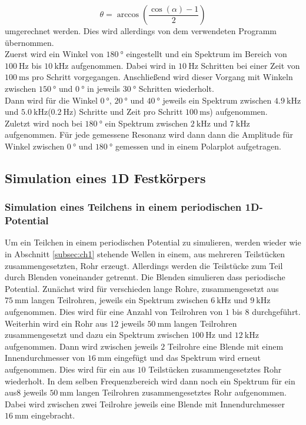 \begin{equation}
  \label{eqn:de1ch2}
  \theta = \arccos\left( \frac{\cos(\alpha) - 1}{2} \right)
\end{equation}
umgerechnet werden. Dies wird allerdings von dem verwendeten Programm übernommen.\\
Zuerst wird ein Winkel von $\SI{180}{\degree}$
eingestellt und ein Spektrum im Bereich von
$\SI{100}{\hertz}$ bis $\SI{10}{\kilo\hertz}$
aufgenommen. Dabei wird in $\SI{10}{\hertz}$ Schritten
bei einer Zeit von $\SI{100}{\milli\second}$ pro Schritt
vorgegangen. Anschließend wird dieser Vorgang mit
Winkeln zwischen $\SI{150}{\degree}$ und $\SI{0}{\degree}$
in jeweils $\SI{30}{\degree}$ Schritten wiederholt.\\
Dann wird für die Winkel $\SI{0}{\degree}$,
$\SI{20}{\degree}$ und $\SI{40}{\degree}$ jeweils
ein Spektrum zwischen $\SI{4,9}{\kilo\hertz}$ und
$\SI{5,0}{\kilo\hertz}$($\SI{0,2}{\hertz}$) Schritte
und Zeit pro Schritt $\SI{100}{\milli\second}$)
aufgenommen.\\
Zuletzt wird noch bei $\SI{180}{\degree}$ ein Spektrum
zwischen $\SI{2}{\kilo\hertz}$ und $\SI{7}{\kilo\hertz}$
aufgenommen. Für jede gemessene Resonanz wird dann
dann die Amplitude für Winkel zwischen $\SI{0}{\degree}$
und $\SI{180}{\degree}$ gemessen und in einem Polarplot
aufgetragen.

\subsection{Simulation eines 1D Festkörpers}
\label{subsec:ch4}

\subsubsection{Simulation eines Teilchens in einem
periodischen 1D-Potential}
\label{subsubsec:ch4a}
Um ein Teilchen in einem periodischen Potential
zu simulieren, werden wieder wie in Abschnitt
\ref{subsec:ch1} stehende Wellen in einem, aus
mehreren Teilstücken zusammengesetzten, Rohr
erzeugt. Allerdings werden die Teilstücke zum Teil durch
Blenden voneinander getrennt. Die Blenden simulieren
dass periodische Potential.
Zunächst wird für verschieden lange Rohre, zusammengesetzt
aus $\SI{75}{\milli\meter}$ langen Teilrohren, jeweils
ein Spektrum zwischen $\SI{6}{\kilo\hertz}$ und
$\SI{9}{\kilo\hertz}$ aufgenommen. Dies wird für eine Anzahl
von Teilrohren von $1$ bis $8$ durchgeführt.\\
Weiterhin wird ein Rohr aus $12$ jeweils
$\SI{50}{\milli\meter}$ langen Teilrohren zusammengesetzt
und dazu ein Spektrum zwischen $\SI{100}{\hertz}$
und $\SI{12}{\kilo\hertz}$ aufgenommen.
Dann wird zwischen jeweils $2$ Teilrohre eine Blende
mit einem Innendurchmesser von $\SI{16}{\milli\meter}$
eingefügt und das Spektrum wird erneut aufgenommen.
Dies wird für ein aus $10$ Teilstücken
zusammengesetztes Rohr wiederholt.
In dem selben Frequenzbereich wird dann noch ein
Spektrum für ein aus$8$ jeweils $\SI{50}{\milli\meter}$
langen Teilrohren zusammengesetztes Rohr aufgenommen.
Dabei wird zwischen zwei Teilrohre jeweils eine
Blende mit Innendurchmesser $\SI{16}{\milli\meter}$
eingebracht.


